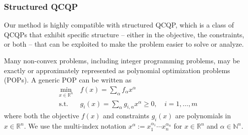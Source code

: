 \documentclass[10pt]{article} %
\theoremstyle{plain}
\theoremstyle{definition}
\theoremstyle{remark}
\begin{document}


\subsubsection{Structured QCQP} \label{sec:structured-QCQP}

Our method is highly compatible with structured QCQP, which is a class of QCQPs that exhibit specific structure -- either in the objective, the constraints, or both -- that can be exploited to make the problem easier to solve or analyze.

Many non-convex problems, including integer programming problems, may be exactly or approximately represented as polynomial optimization problems (POPs). A generic POP can be written as
\begin{equation}
\begin{aligned}
\min_{x \in \mathbb{R}^n}~& f(x) = \sum_\alpha f_\alpha x^\alpha \\
\text{s.t.}~~& g_i(x) =\sum_\alpha g_{i, \alpha} x^\alpha \geq 0, \quad i=1, \ldots, m
\end{aligned}
\label{eq:POP}
\end{equation}
where both the objective \( f(x) \) and constraints \( g_i(x) \) are polynomials in \( x \in \mathbb{R}^n \). We use the multi-index notation $x^\alpha:=x_1^{\alpha_1} \cdots x_n^{\alpha_n}$ for $x \in \mathbb{R}^n$ and $\alpha \in \mathbb{N}^n$.
\end{document}

